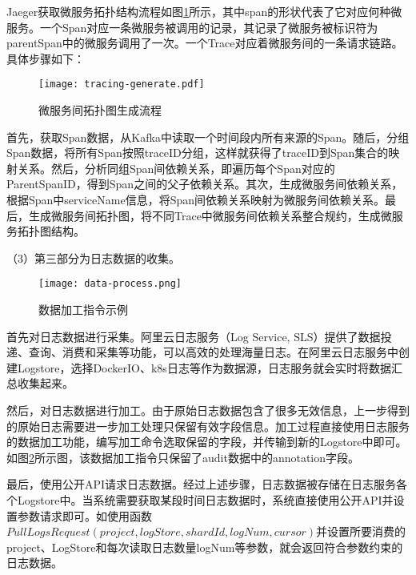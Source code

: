     Jaeger获取微服务拓扑结构流程如图\ref{tracing-generate}所示，其中span的形状代表了它对应何种微服务。一个Span对应一条微服务被调用的记录，其记录了微服务被标识符为parentSpan中的微服务调用了一次。一个Trace对应着微服务间的一条请求链路。具体步骤如下：

    \begin{figure}[htbp]
        \centering
        \texttt{[image: tracing-generate.pdf]}
        \caption{微服务间拓扑图生成流程\label{tracing-generate}}
    \end{figure}

    首先，获取Span数据，从Kafka中读取一个时间段内所有来源的Span。随后，分组Span数据，将所有Span按照traceID分组，这样就获得了traceID到Span集合的映射关系。然后，分析同组Span间依赖关系，即遍历每个Span对应的ParentSpanID，得到Span之间的父子依赖关系。其次，生成微服务间依赖关系，根据Span中serviceName信息，将Span间依赖关系映射为微服务间依赖关系。最后，生成微服务间拓扑图，将不同Trace中微服务间依赖关系整合规约，生成微服务拓扑图结构。

    （3）第三部分为日志数据的收集。
    \begin{figure}[htbp]
        \centering
        \texttt{[image: data-process.png]}
        \caption{数据加工指令示例\label{data-process}}
    \end{figure}

    首先对日志数据进行采集。阿里云日志服务（Log Service, SLS）提供了数据投递、查询、消费和采集等功能，可以高效的处理海量日志。在阿里云日志服务中创建Logstore，选择DockerIO、k8s日志等作为数据源，日志服务就会实时将数据汇总收集起来。

    然后，对日志数据进行加工。由于原始日志数据包含了很多无效信息，上一步得到的原始日志需要进一步加工处理只保留有效字段信息。加工过程直接使用日志服务的数据加工功能，编写加工命令选取保留的字段，并传输到新的Logstore中即可。如图\ref{data-process}所示图，该数据加工指令只保留了audit数据中的annotation字段。

    最后，使用公开API请求日志数据。经过上述步骤，日志数据被存储在日志服务各个Logstore中。当系统需要获取某段时间日志数据时，系统直接使用公开API并设置参数请求即可。如使用函数$PullLogsRequest(project, logStore, shardId, logNum, cursor)$并设置所要消费的project、LogStore和每次读取日志数量logNum等参数，就会返回符合参数约束的日志数据。

